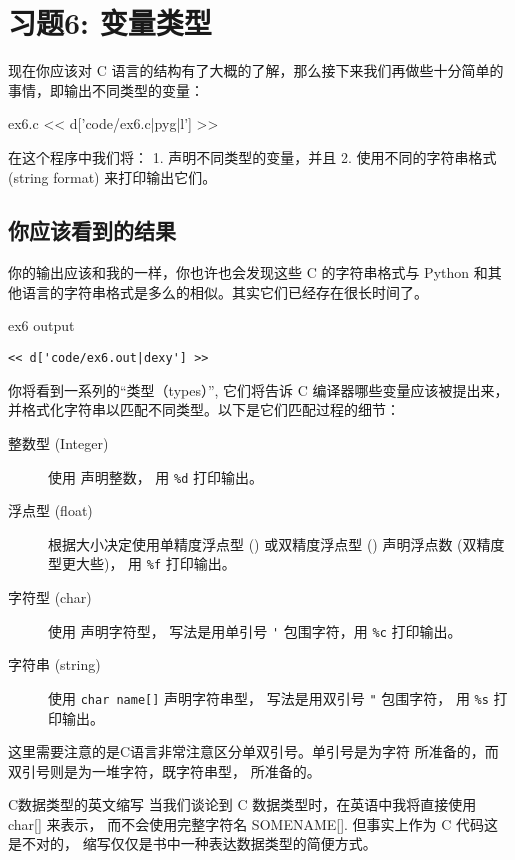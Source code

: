 \chapter{习题6: 变量类型}

现在你应该对 C 语言的结构有了大概的了解，那么接下来我们再做些十分简单的事情，即输出不同类型的变量：

\begin{code}{ex6.c}
<< d['code/ex6.c|pyg|l'] >>
\end{code}

在这个程序中我们将：
1. 声明不同类型的变量，并且
2. 使用不同的字符串格式(string format)  来打印输出它们。


\section{你应该看到的结果}

你的输出应该和我的一样，你也许也会发现这些 C 的字符串格式与 Python 和其他语言的字符串格式是多么的相似。其实它们已经存在很长时间了。

\begin{code}{ex6 output}
\begin{lstlisting}
<< d['code/ex6.out|dexy'] >>
\end{lstlisting}
\end{code}

你将看到一系列的“类型（types）”, 它们将告诉 C 编译器哪些变量应该被提出来，并格式化字符串以匹配不同类型。以下是它们匹配过程的细节：

\begin{description}
\item[整数型 (Integer) ] 使用  声明整数， 用 \verb|%d| 打印输出。
\item[浮点型 (float)] 根据大小决定使用单精度浮点型 () 或双精度浮点型 () 声明浮点数 (双精度型更大些)， 用 \verb|%f| 打印输出。
\item[字符型 (char)] 使用  声明字符型， 写法是用单引号 \verb|'| 包围字符，用 \verb|%c| 打印输出。
\item[字符串 (string)] 使用 \verb|char name[]| 声明字符串型， 写法是用双引号 \verb|"| 包围字符， 用 \verb|%s| 打印输出。 
\end{description}

这里需要注意的是C语言非常注意区分单双引号。单引号是为字符  所准备的，而双引号则是为一堆字符，既字符串型，  所准备的。

\begin{aside}{C数据类型的英文缩写}
当我们谈论到 C 数据类型时，在英语中我将直接使用 char[] 来表示， 而不会使用完整字符名 SOMENAME[]. 但事实上作为 C 代码这是不对的， 缩写仅仅是书中一种表达数据类型的简便方式。
\end{aside}

